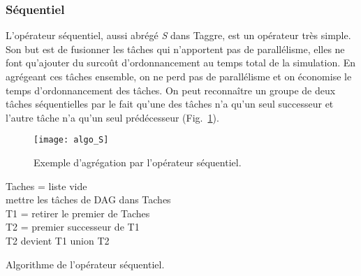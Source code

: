 \subsubsection{Séquentiel}
L'opérateur séquentiel, aussi abrégé {\em S} dans Taggre, est un opérateur très simple.
%
Son but est de fusionner les tâches qui n'apportent pas de parallélisme, elles ne font qu'ajouter du surcoût d'ordonnancement au temps total de la simulation.
%
En agrégeant ces tâches ensemble, on ne perd pas de parallélisme et on économise le temps d'ordonnancement des tâches.
%
On peut reconnaître un groupe de deux tâches séquentielles par le fait qu'une des tâches n'a qu'un seul successeur et l'autre tâche n'a qu'un seul prédécesseur (Fig.~\ref{fig:algo_S}).


\begin{figure}[t!]
  \centering
  \texttt{[image: algo\_S]}
  \caption{Exemple d'agrégation par l'opérateur séquentiel.}
  \label{fig:algo_S}
\end{figure}

\begin{algorithm}
  {\sc Taches} = liste vide \\
  mettre les tâches de DAG dans {\sc Taches} \\
   {
    {\sc T1} = retirer le premier de {\sc Taches} \\
     {
      {\sc T2} = premier successeur de {\sc T1} \\
       {
        {\sc T2} devient {\sc T1} union {\sc T2}\\
      }
    }
  }
  \caption{Algorithme de l'opérateur séquentiel.}
  \label{algo:algo_S}
\end{algorithm}

